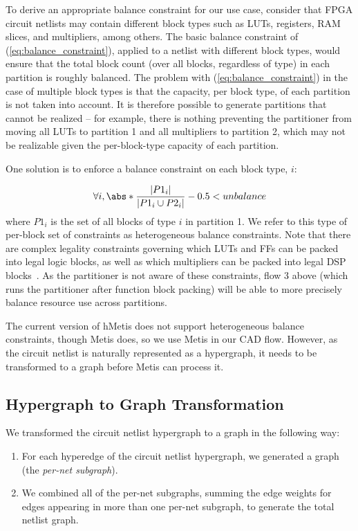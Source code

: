 To derive an appropriate balance constraint for our use case, consider that FPGA circuit netlists may contain different block types such as LUTs, registers, RAM slices, and multipliers, among others. The basic balance constraint of (\ref{eq:balance_constraint}), applied to a netlist with different block types, would ensure that the total block count (over all blocks, regardless of type) in each partition is roughly balanced. The problem with (\ref{eq:balance_constraint}) in the case of multiple block types is that the capacity, per block type, of each partition is not taken into account. It is therefore possible to generate partitions that cannot be realized -- for example, there is nothing preventing the partitioner from moving all LUTs to partition 1 and all multipliers to partition 2, which may not be realizable given the per-block-type capacity of each partition.

One solution is to enforce a balance constraint on each block type, $i$:

\begin{equation}
\forall i, \abs*{ \frac{| P1_i |}{|P1_i \cup P2_i |} - 0.5} < unbalance
\end{equation}
where $P1_i$ is the set of all blocks of type $i$ in partition 1. We refer to this type of per-block set of constraints as heterogeneous balance constraints. Note that there are complex legality constraints governing which LUTs and FFs can be packed into legal logic blocks, as well as which multipliers can be packed into legal DSP blocks~\cite{luu2014vtr}. As the partitioner is not aware of these constraints, flow 3 above (which runs the partitioner after function block packing) will be able to more precisely balance resource use across partitions.

The current version of hMetis does not support heterogeneous balance constraints, though Metis does, so we use Metis in our CAD flow. However, as the circuit netlist is naturally represented as a hypergraph, it needs to be transformed to a graph before Metis can process it.

\subsection{Hypergraph to Graph Transformation}\label{sec:hypergraph_to_graph}
We transformed the circuit netlist hypergraph to a graph in the following way:
\begin{enumerate}[label=(\roman*)]
\item For each hyperedge of the circuit netlist hypergraph, we generated a graph (the \emph{per-net subgraph}).
\item We combined all of the per-net subgraphs, summing the edge weights for edges appearing in more than one per-net subgraph, to generate the total netlist graph.
\end{enumerate}


